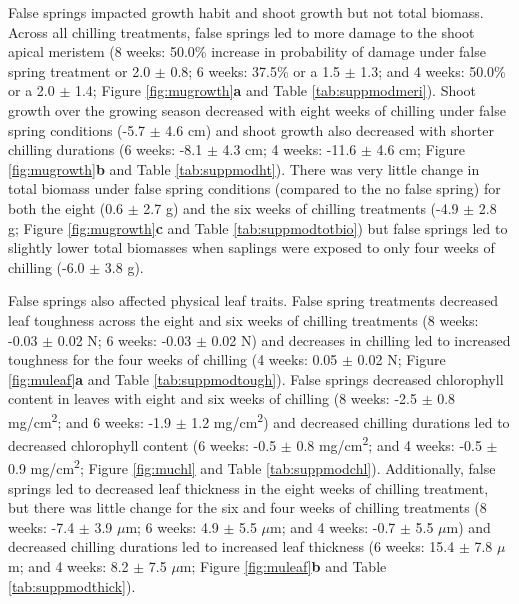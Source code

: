 \documentclass{article}\usepackage[]{graphicx}\usepackage[]{color}
\begin{document}
\begin{enumerate}
False springs impacted growth habit and shoot growth but not total biomass. Across all chilling treatments, false springs led to more damage to the shoot apical meristem (8 weeks: 50.0\% increase in probability of damage under false spring treatment or 2.0 $\pm$ 0.8; 6 weeks: 37.5\% or a 1.5 $\pm$ 1.3; and 4 weeks: 50.0\% or a 2.0 $\pm$ 1.4; Figure \ref{fig:mugrowth}\textbf{a} and Table \ref{tab:suppmodmeri}). Shoot growth over the growing season decreased with eight weeks of chilling under false spring conditions (-5.7 $\pm$ 4.6 cm) and shoot growth also decreased with shorter chilling durations (6 weeks: -8.1 $\pm$ 4.3 cm; 4 weeks: -11.6 $\pm$ 4.6 cm; Figure \ref{fig:mugrowth}\textbf{b} and Table \ref{tab:suppmodht}). There was very little change in total biomass under false spring conditions (compared to the no false spring) for both the eight (0.6 $\pm$ 2.7 g) and the six weeks of chilling treatments (-4.9 $\pm$ 2.8 g; Figure \ref{fig:mugrowth}\textbf{c} and Table \ref{tab:suppmodtotbio}) but false springs led to slightly lower total biomasses when saplings were exposed to only four weeks of chilling (-6.0 $\pm$ 3.8 g).
  
False springs also affected physical leaf traits. False spring treatments decreased leaf toughness across the eight and six weeks of chilling treatments (8 weeks: -0.03 $\pm$ 0.02 N; 6 weeks: -0.03 $\pm$ 0.02 N) and decreases in chilling led to increased toughness for the four weeks of chilling (4 weeks: 0.05 $\pm$ 0.02 N; Figure \ref{fig:muleaf}\textbf{a} and Table \ref{tab:suppmodtough}). False springs decreased chlorophyll content in leaves with eight and six weeks of chilling (8 weeks: -2.5 $\pm$ 0.8 mg/cm\textsuperscript{2}; and 6 weeks: -1.9 $\pm$ 1.2 mg/cm\textsuperscript{2}) and decreased chilling durations led to decreased chlorophyll content (6 weeks: -0.5 $\pm$ 0.8 mg/cm\textsuperscript{2}; and 4 weeks: -0.5 $\pm$ 0.9 mg/cm\textsuperscript{2}; Figure \ref{fig:muchl} and Table \ref{tab:suppmodchl}). Additionally, false springs led to decreased leaf thickness in the eight weeks of chilling treatment, but there was little change for the six and four weeks of chilling treatments (8 weeks: -7.4 $\pm$ 3.9 $\mu$m; 6 weeks: 4.9 $\pm$ 5.5 $\mu$m; and 4 weeks: -0.7 $\pm$ 5.5 $\mu$m) and decreased chilling durations led to increased leaf thickness (6 weeks: 15.4 $\pm$ 7.8 $\mu$m; and 4 weeks: 8.2 $\pm$ 7.5 $\mu$m; Figure \ref{fig:muleaf}\textbf{b} and Table \ref{tab:suppmodthick}). 
  

\end{enumerate}
\end{document}
